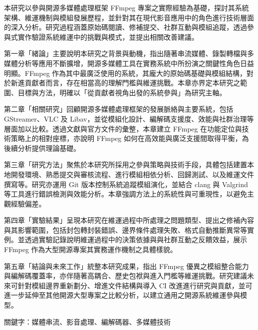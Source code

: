 \newpage
{}
\normalsize


本研究以參與開源多媒體處理框架 FFmpeg 專案之實際經驗為基礎，探討其系統架構、維運機制與模組發展歷程，並針對其在現代影音應用中的角色進行技術層面的深入分析。研究過程涵蓋原始碼閱讀、修補提交、社群互動與模組追蹤，透過參與式實作驗證系統維運中的挑戰與模式，並提出相關改善建議。

第一章「緒論」主要說明本研究之背景與動機，指出隨著串流媒體、錄製轉檔與多媒體分析等應用不斷擴增，開源多媒體工具在實務系統中所扮演之關鍵性角色日益明顯。FFmpeg 作為其中最廣泛使用的系統，其龐大的原始碼基礎與模組結構，對於新進貢獻者而言，存在相當高的理解門檻與維運挑戰。本章亦界定本研究之範圍、目標與方法，明確以「從貢獻者視角出發的系統參與」為研究主軸。

第二章「相關研究」回顧開源多媒體處理框架的發展脈絡與主要系統，包括 GStreamer、VLC 及 Libav，並從模組化設計、編解碼支援度、效能與社群治理等層面加以比較。透過文獻與官方文件的彙整，本章建立 FFmpeg 在功能定位與技術策略上的相對座標，亦說明 FFmpeg 如何在高效能與廣泛支援間取得平衡，為後續分析提供理論基礎。

第三章「研究方法」聚焦於本研究所採用之參與策略與技術手段，具體包括建置本地開發環境、熟悉提交與審核流程、進行模組相依分析、回歸測試、以及維運文件撰寫等。研究亦運用 Git 版本控制系統追蹤模組演化，並結合 clang 與 Valgrind 等工具進行錯誤檢測與效能分析。本章強調方法上的系統性與可重現性，以避免主觀經驗偏差。

第四章「實驗結果」呈現本研究在維運過程中所處理之問題類型、提出之修補內容與其影響範圍，包括封包轉封裝錯誤、邊界條件處理失敗、格式自動推斷異常等實例。並透過實驗記錄說明維運過程中的決策依據與與社群互動之反饋效益，展示 FFmpeg 作為大型開源專案其實務運作機制之具體樣貌。

第五章「結論與未來工作」統整本研究成果，指出 FFmpeg 優異之模組整合能力與編解碼覆蓋率，亦伴隨著高耦合、歷史包袱與進入門檻等維運挑戰。研究建議未來可針對模組邊界重新劃分、增進文件結構與導入 CI 改進進行研究與貢獻，並可進一步延伸至其他開源大型專案之比較分析，以建立通用之開源系統維運參與模型。

關鍵字：媒體串流、影音處理、編解碼器、多媒體技術